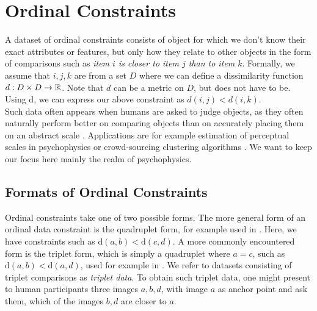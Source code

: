 
\section{Ordinal Constraints}
A dataset of ordinal constraints consists of object for which we don't know their exact attributes or features, but only how they relate to other objects
in the form of comparisons such as \textit{item $i$ is closer to item $j$ than to item $k$}. Formally, we assume that $i, j, k$ are from 
a set $D$ where we can define a dissimilarity function $d: D \times D \to \mathbb{R}$. Note that $d$ can be a metric on $D$, but does not have to be.
Using d, we can express our above constraint as $d(i, j) < d(i, k)$. \\

Such data often appears when humans are asked to judge objects, as they often naturally perform better on comparing objects
than on accurately placing them on an abstract scale \citep{stewartAbsoluteIdentificationRelative2005}. Applications are for example estimation of perceptual scales in psychophysics 
\citep{haghiriEstimationPerceptualScales2020} or crowd-sourcing clustering algorithms \citep{ukkonenCrowdsourcedCorrelationClustering2017}. 
We want to keep our focus here mainly the realm of psychophysics.


\subsection{Formats of Ordinal Constraints}
Ordinal constraints take one of two possible forms. 
The more general form of an ordinal data constraint is the quadruplet form, for example used in \cite{ghoshdastidarFoundationsComparisonBasedHierarchical2019}. 
Here, we have constraints such as $\text{d}(a,b) < \text{d}(c,d)$. A more commonly encountered form is the triplet form, which is simply a quadruplet where $a = c$, such as
$\text{d}(a,b) < \text{d}(a,d)$, used for example in \cite{vankadaraInsightsOrdinalEmbedding2021,haghiriComparisonBasedFrameworkPsychophysics2019}. We refer to datasets
consisting of triplet comparisons as \textit{triplet data}.
To obtain such triplet data, one might present to human participants three images $a, b, d$, with image $a$ as anchor point and ask them, which of the images $b,d$ are closer to $a$. \\

